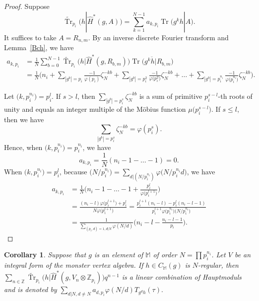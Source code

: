 \documentclass[10pt,a4paper]{amsart}
\numberwithin{equation}{section}
\newtheorem{Corollary}[Theorem]{Corollary}
\begin{document}
\begin{proof}
Suppose
\[
\widetilde{\operatorname{Tr}}_{p_i}\big(h|\hat{H}^*(g,A)\big)=\sum_{k=1}^{N-1}a_{k,p_i}\operatorname{Tr}\big(g^kh|A\big). \]
It suffices to take $A=R_{n,m}$.
By an inverse discrete Fourier transform and Lemma~\ref{Bch}, we have
\begin{align*}
a_{k,p_i}&=\frac{1}{N}\sum_{b=0}^{N-1}\widetilde{\operatorname{Tr}}_{p_i}\big(h|\hat{H}^*(g,R_{b,m})\big)\overline{\operatorname{Tr}\big(g^kh|R_{b,m}\big)} \\
 &=\frac{1}{N}\Bigg(n_i+\sum_{|g^b|=p_i} \frac{-1}{\varphi (p_i)}\zeta_N^{-kb}+\sum_{ |g^b|=p_i^2} \frac{-1}{\varphi \big(p_i^2\big)}\zeta_N^{-kb}+\dots+\sum_{|g^b|=p_i^{n_i}} \frac{-1}{\varphi \big(p_i^{n_i}\big)}\zeta_N^{-kb}\Bigg).
\end{align*}

Let $\big(k,p_i^{n_i}\big)=p_i^l$. If $s>l$, then $\sum_{|g^b|=p_i^s}\zeta_N^{-kb}$ is a sum of primitive $p_i^{s-l}$-th roots of unity and equals an integer multiple of the M\"obius function $\mu\big(p_i^{s-l}\big)$. If $s\leq l$, then we have
\[
\sum_{|g^b|=p_i^s}\zeta_N^{-kb}=\varphi(p_i^s).
\]
Hence, when $\big(k,p_i^{n_i}\big)=p_i^{n_i}$, we have 
\[ a_{k,p_i}=\frac{1}{N}(n_i-1-\dots-1)=0.\]
When $\big(k,p_i^{n_i}\big)=p_i^{l}$, because $\big(N/p_i^{n_i}\big)=\sum_{d|(N/p_i^{n_i})}\varphi\big(N/p_i^{n_i}d\big)$, we have
\begin{align*}
a_{k,p_i}&=\frac{1}{N}\Bigg(n_i-1-\dots-1+\frac{p_i^l}{\varphi \big(p_i^{l+1}\big)}\Bigg)\\
 &=\frac{(n_i-l)\varphi \big(p_i^{l+1}\big)+p_i^l}{N\varphi \big(p_i^{l+1}\big)} =\frac{p_i^{l+1}(n_i-l)-p_i^l(n_i-l-1)}{p_i^{l+1}\varphi\big(p_i^{n_i}\big)\big(N/p_i^{n_i}\big)}\\
 &=\frac{1}{\sum_{(p_i,d)=1,d|N}\varphi (N/d)}\bigg(n_i-l-\frac{n_i-l-1}{p_i}\bigg).\tag*{\qed}
\end{align*}\renewcommand{\qed}{}
\end{proof}


\begin{Corollary} \label{newHaup}
Suppose that $g$ is an element of $\mathbb{M}$ of order $N=\prod p_i^{n_i}$. Let $V$ be an integral form of the monster vertex algebra. If $h\in C_{\mathbb{M}}(g)$ is $N$-regular, then $\sum_{n\in \mathbb{Z}}\widetilde{\operatorname{Tr}}_{p_i}\big(h|\hat{H}^*(g,V_n\otimes \mathbb{Z}_{p_i})\big)q^{n-1}$ is a linear combination of Hauptmoduls and is denoted by $\sum_{d|N, d\neq N}a_{d,p_i}\varphi (N/d)T_{g^dh}(\tau).$
\end{Corollary}
\end{document}
